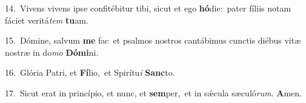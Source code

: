 {\numbfont\textcolor{\numbcolor}{14.}}~Vivens vivens ipse confitébitur tibi, sicut et ego \textbf{hó}\-die:~\star pater fíliis notam fáciet veritá\textit{tem} \textbf{tu}\-am.\par
{\numbfont\textcolor{\numbcolor}{15.}}~Dómine, salvum \textbf{me} fac~\star et psalmos nostros cantábimus cunctis diébus vitæ nostræ in do\textit{mo} \textbf{Dó}\-\textbf{mi}ni.\par
{\numbfont\textcolor{\numbcolor}{16.}}~Glória Patri, et \textbf{Fí}\-lio,~\star et Spirítu\textit{i} \textbf{Sanc}\-to.\par
{\numbfont\textcolor{\numbcolor}{17.}}~Sicut erat in princípio, et nunc, et \textbf{sem}\-per,~\star et in sǽcula sæculó\-\textit{rum}\-. \textbf{A}\-men.\par

